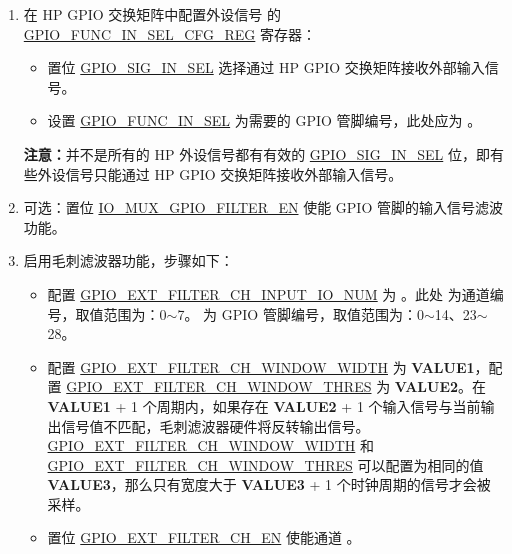\documentclass[main\_\_CN.tex]{subfiles}
\begin{document}
\begin{enumerate}
    \item 在 HP GPIO 交换矩阵中配置外设信号  的 \hyperref[regdesc:GPIOFUNCMINSELCFGREG]{GPIO\_FUNC\_IN\_SEL\_CFG\_REG} 寄存器：
    \begin{itemize}
        \item 置位 \hyperref[fielddesc:GPIOSIGNINSEL]{GPIO\_SIG\_IN\_SEL} 选择通过 HP GPIO 交换矩阵接收外部输入信号。
        \item 设置 \hyperref[fielddesc:GPIOFUNCNINSEL]{GPIO\_FUNC\_IN\_SEL} 为需要的 GPIO 管脚编号，此处应为 。
    \end{itemize}
    {\bfseries 注意：}并不是所有的 HP 外设信号都有有效的 \hyperref[fielddesc:GPIOSIGNINSEL]{GPIO\_SIG\_IN\_SEL} 位，即有些外设信号只能通过 HP GPIO 交换矩阵接收外部输入信号。
    \item \label{step:2} 可选：置位 \hyperref[fielddesc:IOMUXGPIONFILTEREN]{IO\_MUX\_GPIO\_FILTER\_EN} 使能 GPIO 管脚的输入信号滤波功能。
\item \label{step:3} 启用毛刺滤波器功能，步骤如下：
\begin{itemize}
    \item 配置 \hyperref[fielddesc:GPIOEXTFILTERCH0INPUTIONUM]{GPIO\_EXT\_FILTER\_CH\_INPUT\_IO\_NUM} 为 。此处  为通道编号，取值范围为：0$\sim$7。 为 GPIO 管脚编号，取值范围为：0$\sim$14、23$\sim$28。
    \item 配置 \hyperref[fielddesc:GPIOEXTFILTERCH0WINDOWWIDTH]{GPIO\_EXT\_FILTER\_CH\_WINDOW\_WIDTH} 为 \textbf{VALUE1}，配置 \hyperref[fielddesc:GPIOEXTFILTERCH0WINDOWTHRES]{GPIO\_EXT\_FILTER\_CH\_WINDOW\_THRES} 为 \textbf{VALUE2}。在 \textbf{VALUE1} + 1 个周期内，如果存在 \textbf{VALUE2} + 1 个输入信号与当前输出信号值不匹配，毛刺滤波器硬件将反转输出信号。\hyperref[fielddesc:GPIOEXTFILTERCH0WINDOWWIDTH]{GPIO\_EXT\_FILTER\_CH\_WINDOW\_WIDTH} 和 \hyperref[fielddesc:GPIOEXTFILTERCH0WINDOWTHRES]{GPIO\_EXT\_FILTER\_CH\_WINDOW\_THRES} 可以配置为相同的值 \textbf{VALUE3}，那么只有宽度大于 \textbf{VALUE3} + 1 个时钟周期的信号才会被采样。
    \item 置位 \hyperref[fielddesc:GPIOEXTFILTERCH0EN]{GPIO\_EXT\_FILTER\_CH\_EN} 使能通道 。
\end{itemize}


\end{enumerate}
\end{document}
